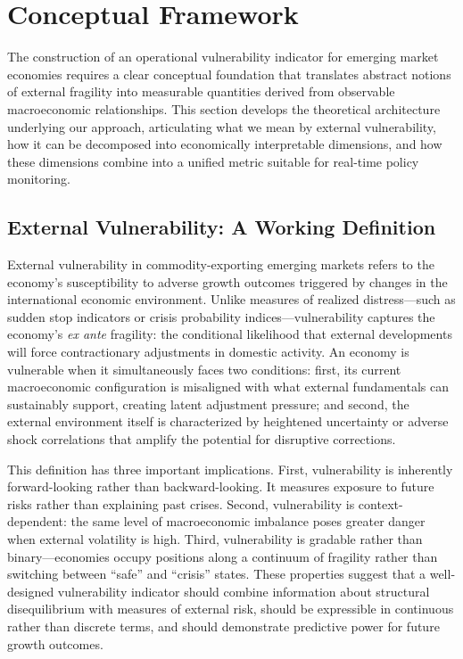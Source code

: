 \documentclass[12pt,a4paper]{article}
\numberwithin{equation}{section}
\theoremstyle{definition}
\theoremstyle{remark}
\begin{document}
\section{Conceptual Framework}
\label{sec:framework}

The construction of an operational vulnerability indicator for emerging market economies requires a clear conceptual foundation that translates abstract notions of external fragility into measurable quantities derived from observable macroeconomic relationships. This section develops the theoretical architecture underlying our approach, articulating what we mean by external vulnerability, how it can be decomposed into economically interpretable dimensions, and how these dimensions combine into a unified metric suitable for real-time policy monitoring.


\subsection{External Vulnerability: A Working Definition}

External vulnerability in commodity-exporting emerging markets refers to the economy's susceptibility to adverse growth outcomes triggered by changes in the international economic environment. Unlike measures of realized distress---such as sudden stop indicators or crisis probability indices---vulnerability captures the economy's \textit{ex ante} fragility: the conditional likelihood that external developments will force contractionary adjustments in domestic activity. An economy is vulnerable when it simultaneously faces two conditions: first, its current macroeconomic configuration is misaligned with what external fundamentals can sustainably support, creating latent adjustment pressure; and second, the external environment itself is characterized by heightened uncertainty or adverse shock correlations that amplify the potential for disruptive corrections.

This definition has three important implications. First, vulnerability is inherently forward-looking rather than backward-looking. It measures exposure to future risks rather than explaining past crises. Second, vulnerability is context-dependent: the same level of macroeconomic imbalance poses greater danger when external volatility is high. Third, vulnerability is gradable rather than binary---economies occupy positions along a continuum of fragility rather than switching between ``safe'' and ``crisis'' states. These properties suggest that a well-designed vulnerability indicator should combine information about structural disequilibrium with measures of external risk, should be expressible in continuous rather than discrete terms, and should demonstrate predictive power for future growth outcomes.
\end{document}
